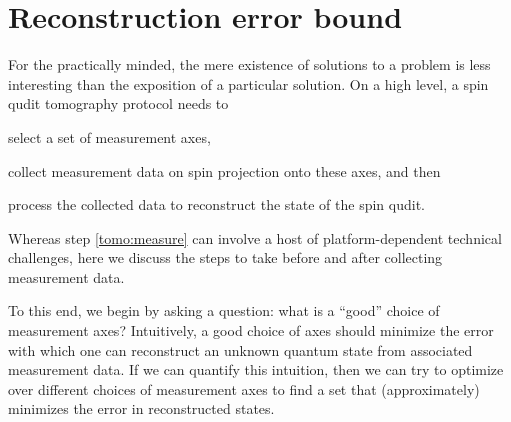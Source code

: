 \documentclass[notitlepage,twocolumn]{revtex4-2}
\newcommand{\1}{\mathds{1}}
\begin{document}
\section{Reconstruction error bound}
\label{sec:bound}

For the practically minded, the mere existence of solutions to a problem is less interesting than the exposition of a particular solution.
On a high level, a spin qudit tomography protocol needs to
\begin{enumerate*}
\item select a set of measurement axes,
\item collect measurement data on spin projection onto these axes, and then
  \label{tomo:measure}
\item process the collected data to reconstruct the state of the spin qudit.
\end{enumerate*}
Whereas step \ref{tomo:measure} can involve a host of platform-dependent technical challenges, here we discuss the steps to take before and after collecting measurement data.

To this end, we begin by asking a question: what is a ``good'' choice of measurement axes?
Intuitively, a good choice of axes should minimize the error with which one can reconstruct an unknown quantum state from associated measurement data.
If we can quantify this intuition, then we can try to optimize over different choices of measurement axes to find a set that (approximately) minimizes the error in reconstructed states.
\end{document}
